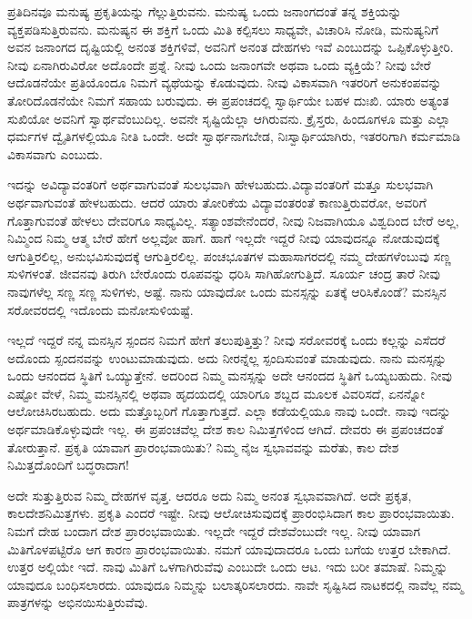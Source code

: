 ಪ್ರತಿದಿನವೂ ಮನುಷ್ಯ ಪ್ರಕೃತಿಯನ್ನು ಗೆಲ್ಲುತ್ತಿರುವನು. ಮನುಷ್ಯ ಒಂದು ಜನಾಂಗದಂತೆ ತನ್ನ ಶಕ್ತಿಯನ್ನು ವ್ಯಕ್ತಪಡಿಸುತ್ತಿರುವನು. ಮನುಷ್ಯನ ಈ ಶಕ್ತಿಗೆ ಒಂದು ಮಿತಿ ಕಲ್ಪಿಸಲು ಸಾಧ್ಯವೇ, ವಿಚಾರಿಸಿ ನೋಡಿ, ಮನುಷ್ಯನಿಗೆ ಅವನ ಜನಾಂಗದ ದೃಷ್ಟಿಯಲ್ಲಿ ಅನಂತ ಶಕ್ತಿಗಳಿವೆ, ಅವನಿಗೆ ಅನಂತ ದೇಹಗಳು ಇವೆ ಎಂಬುದನ್ನು ಒಪ್ಪಿಕೊಳ್ಳುತ್ತೀರಿ. ನೀವು ಏನಾಗಿರುವಿರೋ ಅದೊಂದೇ ಪ್ರಶ್ನೆ. ನೀವು ಒಂದು ಜನಾಂಗವೇ ಅಥವಾ ಒಂದು ವ್ಯಕ್ತಿಯೆ? ನೀವು ಬೇರೆ ಆದೊಡನೆಯೇ ಪ್ರತಿಯೊಂದೂ ನಿಮಗೆ ವ್ಯಥೆಯನ್ನು ಕೊಡುವುದು. ನೀವು ವಿಕಾಸವಾಗಿ ಇತರರಿಗೆ ಅನುಕಂಪವನ್ನು ತೋರಿದೊಡನೆಯೇ ನಿಮಗೆ ಸಹಾಯ ಬರುವುದು. ಈ ಪ್ರಪಂಚದಲ್ಲಿ ಸ್ವಾರ್ಥಿಯೇ ಬಹಳ ದುಃಖಿ. ಯಾರು ಅತ್ಯಂತ ಸುಖಿಯೋ ಅವನಿಗೆ ಸ್ವಾರ್ಥವೆಂಬುದಿಲ್ಲ. ಅವನೇ ಸೃಷ್ಟಿಯೆಲ್ಲಾ ಆಗಿರುವನು. ಕ್ರೈಸ್ತರು, ಹಿಂದೂಗಳೂ ಮತ್ತು ಎಲ್ಲಾ ಧರ್ಮಗಳ ದ್ವೈತಿಗಳಲ್ಲಿಯೂ ನೀತಿ ಒಂದೇ. ಅದೇ ಸ್ವಾರ್ಥನಾಗಬೇಡ, ನಿಃಸ್ವಾರ್ಥಿಯಾಗಿರು, ಇತರರಿಗಾಗಿ ಕರ್ಮಮಾಡಿ ವಿಕಾಸವಾಗು ಎಂಬುದು.

ಇದನ್ನು ಅವಿದ್ಯಾವಂತರಿಗೆ ಅರ್ಥವಾಗುವಂತೆ ಸುಲಭವಾಗಿ ಹೇಳಬಹುದು.\break ವಿದ್ಯಾವಂತರಿಗೆ ಮತ್ತೂ ಸುಲಭವಾಗಿ ಅರ್ಥವಾಗುವಂತೆ ಹೇಳಬಹುದು. ಆದರೆ ಯಾರು ತೋರಿಕೆಯ ವಿದ್ಯಾವಂತರಂತೆ ಕಾಣುತ್ತಿರುವರೋ, ಅವರಿಗೆ ಗೊತ್ತಾಗುವಂತೆ ಹೇಳಲು ದೇವರಿಗೂ ಸಾಧ್ಯವಿಲ್ಲ. ಸತ್ಯಾಂಶವೇನೆಂದರೆ, ನೀವು ನಿಜವಾಗಿಯೂ ವಿಶ್ವದಿಂದ ಬೇರೆ ಅಲ್ಲ, ನಿಮ್ಮಿಂದ ನಿಮ್ಮ ಆತ್ಮ ಬೇರೆ ಹೇಗೆ ಅಲ್ಲವೋ ಹಾಗೆ. ಹಾಗೆ ಇಲ್ಲದೇ ಇದ್ದರೆ ನೀವು ಯಾವುದನ್ನೂ ನೋಡುವುದಕ್ಕೆ ಆಗುತ್ತಿರಲಿಲ್ಲ, ಅನುಭವಿಸುವುದಕ್ಕೆ ಆಗುತ್ತಿರಲಿಲ್ಲ. ಪಂಚಭೂತಗಳ ಮಹಾಸಾಗರದಲ್ಲಿ ನಮ್ಮ ದೇಹಗಳೆಂಬುವು ಸಣ್ಣ ಸುಳಿಗಳಂತೆ. ಜೀವನವು ತಿರುಗಿ ಬೇರೊಂದು ರೂಪವನ್ನು ಧರಿಸಿ ಸಾಗಿಹೋಗುತ್ತಿದೆ. ಸೂರ್ಯ ಚಂದ್ರ ತಾರೆ ನೀವು ನಾವುಗಳೆಲ್ಲ ಸಣ್ಣ ಸಣ್ಣ ಸುಳಿಗಳು, ಅಷ್ಟೆ. ನಾನು ಯಾವುದೋ ಒಂದು ಮನಸ್ಸನ್ನು ಏತಕ್ಕೆ ಆರಿಸಿಕೊಂಡೆ? ಮನಸ್ಸಿನ ಸರೋವರದಲ್ಲಿ ಇದೊಂದು ಮನೋಸುಳಿಯಷ್ಟೆ.

ಇಲ್ಲದೆ ಇದ್ದರೆ ನನ್ನ ಮನಸ್ಸಿನ ಸ್ಪಂದನ ನಿಮಗೆ ಹೇಗೆ ತಲುಪುತ್ತಿತ್ತು? ನೀವು ಸರೋವರಕ್ಕೆ ಒಂದು ಕಲ್ಲನ್ನು ಎಸೆದರೆ ಅದೊಂದು ಸ್ಪಂದನವನ್ನು ಉಂಟುಮಾಡುವುದು. ಅದು ನೀರನ್ನೆಲ್ಲ ಸ್ಪಂದಿಸುವಂತೆ ಮಾಡುವುದು. ನಾನು ಮನಸ್ಸನ್ನು ಒಂದು ಆನಂದದ ಸ್ಥಿತಿಗೆ ಒಯ್ಯುತ್ತೇನೆ. ಅದರಿಂದ ನಿಮ್ಮ ಮನಸ್ಸನ್ನು ಅದೇ ಆನಂದದ ಸ್ಥಿತಿಗೆ ಒಯ್ಯಬಹುದು. ನೀವು ಎಷ್ಟೋ ವೇಳೆ, ನಿಮ್ಮ ಮನಸ್ಸಿನಲ್ಲಿ ಅಥವಾ ಹೃದಯದಲ್ಲಿ ಯಾರಿಗೂ ಶಬ್ದದ ಮೂಲಕ ವಿವರಿಸದೆ, ಏನನ್ನೋ ಆಲೋಚಿಸಿರಬಹುದು. ಅದು ಮತ್ತೊಬ್ಬರಿಗೆ ಗೊತ್ತಾಗುತ್ತದೆ. ಎಲ್ಲಾ ಕಡೆಯಲ್ಲಿಯೂ ನಾವು ಒಂದೇ. ನಾವು ಇದನ್ನು ಅರ್ಥಮಾಡಿಕೊಳ್ಳುವುದೇ ಇಲ್ಲ. ಈ ಪ್ರಪಂಚವೆಲ್ಲ ದೇಶ ಕಾಲ ನಿಮಿತ್ತಗಳಿಂದ ಆಗಿದೆ. ದೇವರು ಈ ಪ್ರಪಂಚದಂತೆ ತೋರುತ್ತಾನೆ. ಪ್ರಕೃತಿ ಯಾವಾಗ ಪ್ರಾರಂಭವಾಯಿತು? ನಿಮ್ಮ ನೈಜ ಸ್ವಭಾವವನ್ನು ಮರೆತು, ಕಾಲ ದೇಶ ನಿಮಿತ್ತದೊಂದಿಗೆ ಬದ್ಧರಾದಾಗ!

ಅದೇ ಸುತ್ತುತ್ತಿರುವ ನಿಮ್ಮ ದೇಹಗಳ ವೃತ್ತ. ಆದರೂ ಅದು ನಿಮ್ಮ ಅನಂತ ಸ್ವಭಾವವಾಗಿದೆ. ಅದೇ ಪ್ರಕೃತ, ಕಾಲದೇಶನಿಮಿತ್ತಗಳು. ಪ್ರಕೃತಿ ಎಂದರೆ ಇಷ್ಟೇ. ನೀವು ಆಲೋಚಿಸುವುದಕ್ಕೆ ಪ್ರಾರಂಭಿಸಿದಾಗ ಕಾಲ ಪ್ರಾರಂಭವಾಯಿತು. ನಿಮಗೆ ದೇಹ ಬಂದಾಗ ದೇಶ ಪ್ರಾರಂಭವಾಯಿತು. ಇಲ್ಲದೇ ಇದ್ದರೆ ದೇಶವೆಂಬುದೇ ಇಲ್ಲ. ನೀವು ಯಾವಾಗ ಮಿತಿಗೊಳಪಟ್ಟಿರೊ ಆಗ ಕಾರಣ ಪ್ರಾರಂಭವಾಯಿತು. ನಮಗೆ ಯಾವುದಾದರೂ ಒಂದು ಬಗೆಯ ಉತ್ತರ ಬೇಕಾಗಿದೆ. ಉತ್ತರ ಅಲ್ಲಿಯೇ ಇದೆ. ನಾವು ಮಿತಿಗೆ ಒಳಗಾಗಿರುವೆವು ಎಂಬುದೇ ಒಂದು ಆಟ. ಇದು ಬರೀ ತಮಾಷೆ. ನಿಮ್ಮನ್ನು ಯಾವುದೂ ಬಂಧಿಸಲಾರದು. ಯಾವುದೂ ನಿಮ್ಮನ್ನು ಬಲಾತ್ಕರಿಸಲಾರದು. ನಾವೇ ಸೃಷ್ಟಿಸಿದ ನಾಟಕದಲ್ಲಿ ನಾವೆಲ್ಲ ನಮ್ಮ ಪಾತ್ರಗಳನ್ನು ಅಭಿನಯಿಸುತ್ತಿರುವೆವು.

